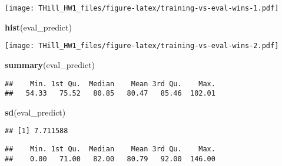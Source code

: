 \documentclass[
]{article}
\newenvironment{Shaded}{\begin{snugshade}}{\end{snugshade}}
\newcommand{\KeywordTok}[1]{\textcolor[rgb]{0.13,0.29,0.53}{\textbf{#1}}}
\newcommand{\NormalTok}[1]{#1}
\newcommand{\OperatorTok}[1]{\textcolor[rgb]{0.81,0.36,0.00}{\textbf{#1}}}
\begin{document}
\begin{Shaded}
\end{Shaded}

\texttt{[image: THill\_HW1\_files/figure-latex/training-vs-eval-wins-1.pdf]}

\begin{Shaded}
\begin{Highlighting}[]
\KeywordTok{hist}\NormalTok{(eval\_predict)}
\end{Highlighting}
\end{Shaded}

\texttt{[image: THill\_HW1\_files/figure-latex/training-vs-eval-wins-2.pdf]}

\begin{Shaded}
\begin{Highlighting}[]
\KeywordTok{summary}\NormalTok{(eval\_predict)}
\end{Highlighting}
\end{Shaded}

\begin{verbatim}
##    Min. 1st Qu.  Median    Mean 3rd Qu.    Max. 
##   54.33   75.52   80.85   80.47   85.46  102.01
\end{verbatim}

\begin{Shaded}
\begin{Highlighting}[]
\KeywordTok{sd}\NormalTok{(eval\_predict)}
\end{Highlighting}
\end{Shaded}

\begin{verbatim}
## [1] 7.711588
\end{verbatim}

\begin{Shaded}
\end{Shaded}

\begin{verbatim}
##    Min. 1st Qu.  Median    Mean 3rd Qu.    Max. 
##    0.00   71.00   82.00   80.79   92.00  146.00
\end{verbatim}

\begin{Shaded}
\end{Shaded}
\end{document}

